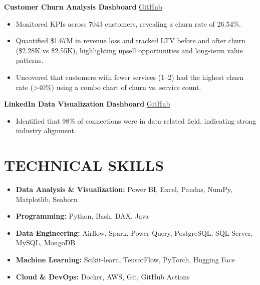 \documentclass[11pt]{article}
\begin{document}
\textbf{Customer Churn Analysis Dashboard} \hfill \href{https://github.com/Mostafa-Elnagar/ChurnAnalysisDashboard}{GitHub}
\begin{itemize}
\item Monitored KPIs across 7043 customers, revealing a churn rate of 26.54\%.
\item Quantified \$1.67M in revenue loss and tracked LTV before and after churn (\$2.28K vs \$2.55K), highlighting upsell opportunities and long-term value patterns.
\item Uncovered that customers with fewer services (1–2) had the highest churn rate (>40\%) using a combo chart of churn vs. service count.\\
\end{itemize}

\textbf{LinkedIn Data Visualization Dashboard} \hfill \href{https://github.com/Mostafa-Elnagar/linkedin-dashboard}{GitHub}
\begin{itemize}
  \item Identified that 98\% of connections were in data-related field, indicating strong industry alignment.
\end{itemize}

\section{TECHNICAL SKILLS}

\begin{itemize}
\item \textbf{Data Analysis \& Visualization:} Power BI, Excel, Pandas, NumPy, Matplotlib, Seaborn
\item \textbf{Programming:} Python, Bash, DAX, Java
\item \textbf{Data Engineering:} Airflow, Spark, Power Query, PostgreSQL, SQL Server, MySQL, MongoDB
\item \textbf{Machine Learning:} Scikit-learn, TensorFlow, PyTorch, Hugging Face
\item \textbf{Cloud \& DevOps:} Docker, AWS, Git, GitHub Actions
\end{itemize}
\end{document}
